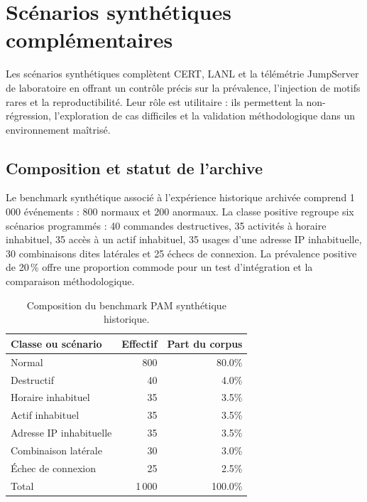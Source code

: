 \documentclass[11pt,a4paper,oneside]{report}
\theoremstyle{definition}
\theoremstyle{plain}
\begin{document}
\section{Scénarios synthétiques complémentaires}
\label{sec:data-historical-benchmark}

Les scénarios synthétiques complètent CERT, LANL et la télémétrie JumpServer
de laboratoire en offrant un contrôle précis sur la prévalence, l'injection de
motifs rares et la reproductibilité. Leur rôle est utilitaire : ils permettent
la non-régression, l'exploration de cas difficiles et la validation
méthodologique dans un environnement maîtrisé.

\subsection{Composition et statut de l'archive}

Le benchmark synthétique associé à l'expérience historique archivée comprend
1\,000 événements : 800 normaux et 200 anormaux. La classe positive regroupe
six scénarios programmés : 40 commandes destructives, 35 activités à horaire
inhabituel, 35 accès à un actif inhabituel, 35 usages d'une adresse IP
inhabituelle, 30 combinaisons dites latérales et 25 échecs de connexion. La
prévalence positive de 20\,\% offre une proportion commode pour un test
d'intégration et la comparaison méthodologique.

\begin{table}[tb]
  \centering
  \caption{Composition du benchmark PAM synthétique historique.}
  \label{tab:eval-dataset}
  \small
  \begin{tabular}{@{}lrr@{}}
    \toprule
    Classe ou scénario & Effectif & Part du corpus \\
    \midrule
    Normal & 800 & 80.0\% \\
    Destructif & 40 & 4.0\% \\
    Horaire inhabituel & 35 & 3.5\% \\
    Actif inhabituel & 35 & 3.5\% \\
    Adresse IP inhabituelle & 35 & 3.5\% \\
    Combinaison latérale & 30 & 3.0\% \\
    Échec de connexion & 25 & 2.5\% \\
    \midrule
    Total & 1\,000 & 100.0\% \\
    \bottomrule
  \end{tabular}
\end{table}
\end{document}

